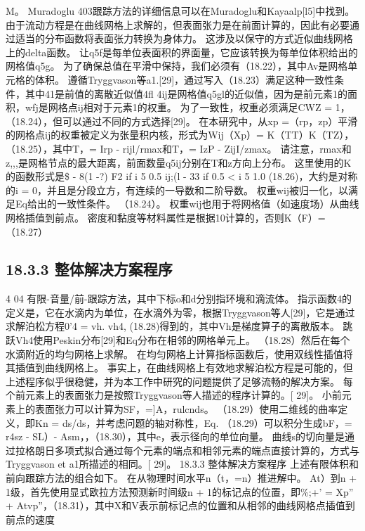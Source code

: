\documentclass[UTF8,11pt,a4paper,openany,fontset=fandol]{ctexbook}
\begin{document}
M。 Muradoglu 403跟踪方法的详细信息可以在Muradoglu和Kayaalp[l5]中找到。 由于流动方程是在曲线网格上求解的，但表面张力是在前面计算的，因此有必要通过适当的分布函数将表面张力转换为身体力。 这涉及以保守的方式近似曲线网格上的delta函数。 让q5f是每单位表面积的界面量，它应该转换为每单位体积给出的网格值q5g。 为了确保总值在平滑中保持，我们必须有（18.22），其中Av是网格单元格的体积。 遵循Tryggvason等a1.[29]，通过写入（18.23）满足这种一致性条件，其中41是前值的离散近似值4fl 4ij是网格值q5gl的近似值，因为是前元素1的面积，wfj是网格点ij相对于元素1的权重。 为了一致性，权重必须满足CWZ = 1，（18.24），但可以通过不同的方式选择[29]。 在本研究中，从xp =（rp，zp）平滑的网格点ij的权重被定义为张量积内核，形式为Wij（Xp）= K（TT）K（TZ），（18.25），其中T，= Irp - rijl/rmax和T，= IzP - ZijI/zmax。 请注意，rmax和z,,,是网格节点的最大距离，前面数量q5ij分别在T和z方向上分布。 这里使用的K的函数形式是\$ - 8(1 -?) F2 if i 5 0.5 ij;(l - 33 if 0.5 < i 5 1.0 (18.26)，大约是对称的i = 0，并且是分段立方，有连续的一导数和二阶导数。 权重wij被归一化，以满足Eq给出的一致性条件。 （18.24）。 权重wij也用于将网格值（如速度场）从曲线网格插值到前点。 密度和黏度等材料属性是根据10计算的，否则K（F）=（18.27）

\subsection{18.3.3 整体解决方案程序}
4 04 有限-音量/前-跟踪方法，其中下标o和d分别指环境和滴流体。 指示函数4的定义是，它在水滴内为单位，在水滴外为零，根据Tryggvason等人[29]，它是通过求解泊松方程0'4 = vh. vh4, (18.28)得到的，其中Vh是梯度算子的离散版本。 跳跃Vh4使用Peskin分布[29]和Eq分布在相邻的网格单元上。 （18.28）然后在每个水滴附近的均匀网格上求解。 在均匀网格上计算指标函数后，使用双线性插值将其插值到曲线网格上。 事实上，在曲线网格上有效地求解泊松方程是可能的，但上述程序似乎很稳健，并为本工作中研究的问题提供了足够流畅的解决方案。 每个前元素上的表面张力是按照Tryggvason等人描述的程序计算的。[ 29]。 小前元素上的表面张力可以计算为SF，=]A，rulcnds。 （18.29）使用二维线的曲率定义，即Kn = ds/ds，并考虑问题的轴对称性，Eq. （18.29）可以积分生成bF，= r4sz - SL）- Asm，，（18.30），其中e，表示径向的单位向量。 曲线s的切向量是通过拉格朗日多项式拟合通过每个元素的端点和相邻元素的端点直接计算的，方式与Tryggvason et a1所描述的相同。[ 29]。 18.3.3 整体解决方案程序 上述有限体积和前向跟踪方法的组合如下。 在从物理时间水平n（t，=n）推进解中。 At）到n + 1级，首先使用显式欧拉方法预测新时间级n + 1的标记点的位置，即\%;+' = Xp” + Atvp”，（18.31），其中X和V表示前标记点的位置和从相邻的曲线网格点插值到前点的速度
\end{document}
